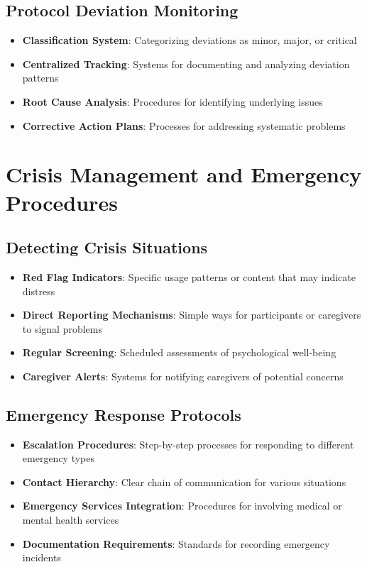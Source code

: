 \subsection{Protocol Deviation Monitoring}
\begin{itemize}
    \item \textbf{Classification System}: Categorizing deviations as minor, major, or critical
    
    \item \textbf{Centralized Tracking}: Systems for documenting and analyzing deviation patterns
    
    \item \textbf{Root Cause Analysis}: Procedures for identifying underlying issues
    
    \item \textbf{Corrective Action Plans}: Processes for addressing systematic problems
\end{itemize}

\section{Crisis Management and Emergency Procedures}
\subsection{Detecting Crisis Situations}
\begin{itemize}
    \item \textbf{Red Flag Indicators}: Specific usage patterns or content that may indicate distress
    
    \item \textbf{Direct Reporting Mechanisms}: Simple ways for participants or caregivers to signal problems
    
    \item \textbf{Regular Screening}: Scheduled assessments of psychological well-being
    
    \item \textbf{Caregiver Alerts}: Systems for notifying caregivers of potential concerns
\end{itemize}

\subsection{Emergency Response Protocols}
\begin{itemize}
    \item \textbf{Escalation Procedures}: Step-by-step processes for responding to different emergency types
    
    \item \textbf{Contact Hierarchy}: Clear chain of communication for various situations
    
    \item \textbf{Emergency Services Integration}: Procedures for involving medical or mental health services
    
    \item \textbf{Documentation Requirements}: Standards for recording emergency incidents
\end{itemize}

